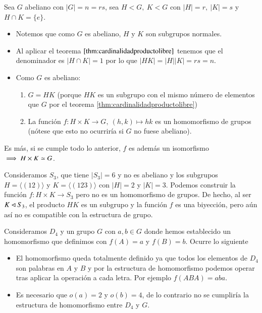 \begin{ej}
	
	Sea $G$ abeliano con $|G| = n = rs$, sea $H < G,\ K < G$ con $|H| = r,\ |K| = s$ y $H\cap K = \{e\}$.
	\begin{itemize}
		\item Notemos que como $G$ es abeliano, $H$ y $K$ son subgrupos normales.
		\item Al aplicar el teorema $\ref{thm:cardinalidadproductolibre}$ tenemos que el denominador es $|H\cap K| = 1$ por lo que $|HK| = |H| |K| = rs= n$.
		\item Como $G$ es abeliano:
		\begin{enumerate}
			\item $G = HK$ (porque $HK$ es un subgrupo con el mismo número de elementos que $G$ por el teorema \ref{thm:cardinalidadproductolibre})
			\item La función $f:H\times K \to G,\ (h, k)\mapsto hk$ es un homomorfismo de grupos (nótese que esto no ocurriría si $G$ no fuese abeliano).
		\end{enumerate}
	\end{itemize}
	
	Es más, si se cumple todo lo anterior, $f$ es además un isomorfismo $\implies H\times K \simeq G$.
\end{ej}

\begin{ej}
	\label{ej:nohomoentreproducto}
	Consideramos $S_3$, que tiene $|S_3| = 6$ y no es abeliano y los subgrupos $H = \langle (12) \rangle$ y $K = \langle (123) \rangle$ con $|H| = 2$ y $|K| = 3$. Podemos construir la función $f:H\times K \to S_3$ pero no es un homomorfismo de grupos. De hecho, al ser $K \lhd S_3$, el producto $HK$ es un subgrupo y la función $f$ es una biyección, pero aún así no es compatible con la estructura de grupo.
\end{ej}

\begin{ej}
	Consideramos $D_4$ y un grupo $G$ con $a,b \in G$ donde hemos establecido un homomorfismo que definimos con $f(A) = a$ y $f(B) = b$. Ocurre lo siguiente
	\begin{itemize}
		\item El homomorfismo queda totalmente definido ya que todos los elementos de $D_4$ son palabras en $A$ y $B$ y por la estructura de homomorfismo podemos operar tras aplicar la operación a cada letra. Por ejemplo $f(ABA) = aba$.
		\item Es necesario que $o(a) = 2$ y $o(b) = 4$, de lo contrario no se cumpliría la estructura de homomorfismo entre $D_4$ y $G$.
	\end{itemize}
\end{ej}



